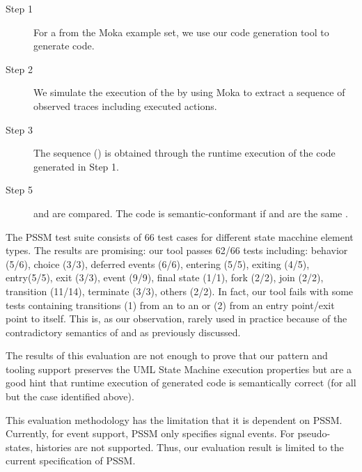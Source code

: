 \begin{description}
	\item[Step 1] For a  from the Moka example set, we use our code generation tool to generate code.
	
	
	\item[Step 2] We simulate the execution of the  by using Moka to extract a sequence  of observed traces including executed actions.
	
	\item[Step 3] The sequence () is obtained through the runtime execution of the code generated in Step 1.
	
	\item[Step 5]  and  are compared. The code is semantic-conformant if  and  are the same \cite{Blech2005}. 
\end{description}

The PSSM test suite consists of 66 test cases for different state macchine element types.
The results are promising: our tool passes 62/66 tests including: behavior (5/6), choice (3/3), deferred events (6/6), entering (5/5), exiting (4/5), entry(5/5), exit (3/3), event (9/9), final state (1/1), fork (2/2), join (2/2), transition (11/14), terminate (3/3), others (2/2).  
In fact, our tool fails with some tests containing transitions (1) from an  to an  or (2) from an entry point/exit point to itself. 
This is, as our observation, rarely used in practice because of the contradictory semantics of  and  as previously discussed. 

The results of this evaluation are not enough to prove that our pattern and tooling support preserves the UML State Machine execution properties but are a good hint that runtime execution of generated code is semantically correct (for all but the case identified above).


This evaluation methodology has the limitation that it is dependent on PSSM.
Currently, for event support, PSSM only specifies signal events.
For pseudo-states, histories are not supported.
Thus, our evaluation result is limited to the current specification of PSSM.

